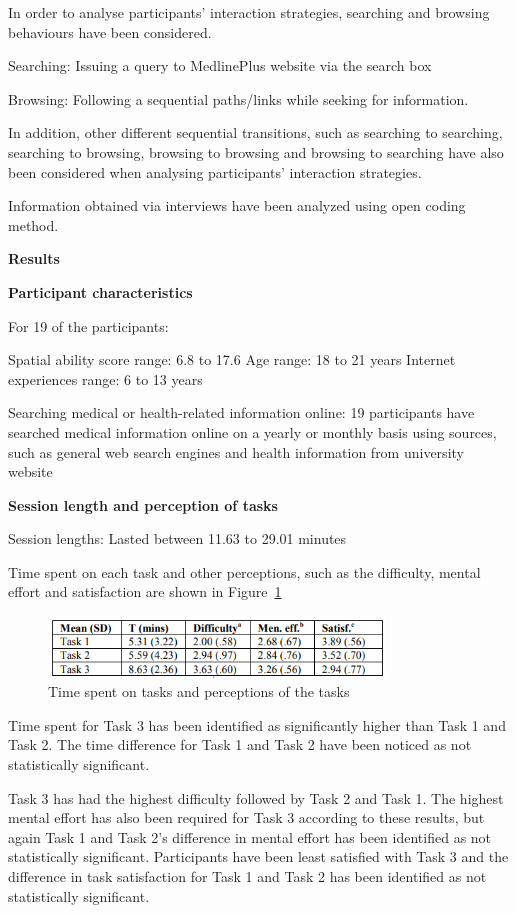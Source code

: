 \documentclass[]{article}
\begin{document}
In order to analyse participants' interaction strategies, searching and browsing behaviours have been considered. 

Searching: Issuing a query to MedlinePlus website via the search box

Browsing: Following a sequential paths/links while seeking for information. 

In addition, other different sequential transitions, such as searching to searching, searching to browsing, browsing to browsing and browsing to searching have also been considered when analysing participants' interaction strategies.     	
	  
Information obtained via interviews have been analyzed using open coding method.

\textbf{Results}

\textbf{Participant characteristics}

For 19 of the participants:

Spatial ability score range: 6.8 to 17.6
Age range: 18 to 21 years
Internet experiences range: 6 to 13 years

Searching medical or health-related information online: 19 participants have searched medical information online on a yearly or monthly basis using sources, such as general web search engines and health information from university website 

\textbf{Session length and perception of tasks}

Session lengths: Lasted between 11.63 to 29.01 minutes

Time spent on each task and other perceptions, such as the difficulty, mental effort and satisfaction are shown in Figure~\ref{fig15}

\begin{figure}[t!]
	\includegraphics[width=0.8\textwidth]{Capture15.png}
	\caption{Time spent on tasks and perceptions of the tasks \label{fig15}}
\end{figure}

Time spent for Task 3 has been identified as significantly higher than Task 1 and Task 2. The time difference for Task 1 and Task 2 have been noticed as not statistically significant. 

Task 3 has had the highest difficulty followed by Task 2 and Task 1. The highest mental effort has also been required for Task 3 according to these results, but again Task 1 and Task 2's difference in mental effort has been identified as not statistically significant. Participants have been least satisfied with Task 3 and the difference in task satisfaction for Task 1 and Task 2 has been identified as not statistically significant.
\end{document}
